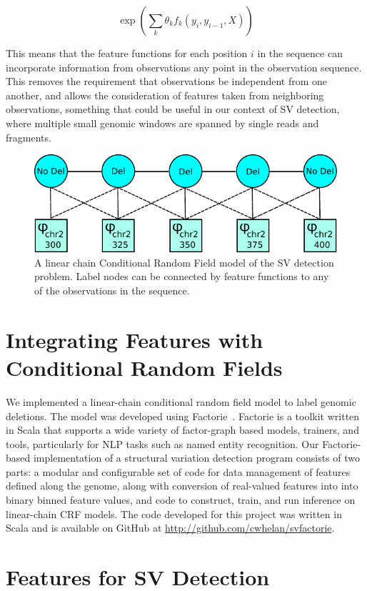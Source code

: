 \[ \exp \left( \sum_k \theta_k f_k(y_i, y_{i-1}, X) \right) \]

This means that the feature functions for each position $i$ in the sequence can incorporate information from observations any point in the observation sequence. This removes the requirement that observations be independent from one another, and allows the consideration of features taken from neighboring observations, something that could be useful in our context of SV detection, where multiple small genomic windows are spanned by single reads and fragments.

\begin{figure}
\centering
\includegraphics[width=.8\textwidth]{figures/graphical-model-2.pdf}
\caption{A linear chain Conditional Random Field model of the SV detection problem. Label nodes can be connected by feature functions to any of the observations in the sequence.}
\label{graphical_model_crf}
\end{figure}

\section{Integrating Features with Conditional Random Fields}

We implemented a linear-chain conditional random field model to label genomic deletions. The model was developed using Factorie~\cite{mccallum09:factorie}. Factorie is a toolkit written in Scala that supports a wide variety of factor-graph based models, trainers, and tools, particularly for NLP tasks such as named entity recognition. Our Factorie-based implementation of a structural variation detection program consists of two parts: a modular and configurable set of code for data management of features defined along the genome, along with conversion of real-valued features into into binary binned feature values, and code to construct, train, and run inference on linear-chain CRF models. The code developed for this project was written in Scala and is available on GitHub at \url{http://github.com/cwhelan/svfactorie}. 

\section{Features for SV Detection}

